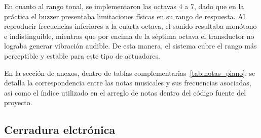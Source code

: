 En cuanto al rango tonal, se implementaron las octavas 4 a 7, dado que en la práctica el buzzer presentaba limitaciones físicas en su rango de respuesta. 
Al reproducir frecuencias inferiores a la cuarta octava, el sonido resultaba monótono e indistinguible, mientras que por encima de la séptima octava el transductor no lograba generar vibración audible. 
De esta manera, el sistema cubre el rango más perceptible y estable para este tipo de actuadores.

En la sección de anexos, dentro de tablas complementarias~\ref{tab:notas_piano}, 
se detalla la correspondencia entre las notas musicales y sus frecuencias asociadas, 
así como el índice utilizado en el arreglo de notas dentro del código fuente del proyecto.

\subsection{Cerradura elctrónica}

